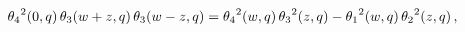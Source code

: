 \[{\mathop{\theta_{4}\/}\nolimits^{2}}\!\left(0,q\right)\mathop{\theta_{3}\/}%
\nolimits\!\left(w+z,q\right)\mathop{\theta_{3}\/}\nolimits\!\left(w-z,q\right%
)={\mathop{\theta_{4}\/}\nolimits^{2}}\!\left(w,q\right){\mathop{\theta_{3}\/}%
\nolimits^{2}}\!\left(z,q\right)-{\mathop{\theta_{1}\/}\nolimits^{2}}\!\left(w%
,q\right){\mathop{\theta_{2}\/}\nolimits^{2}}\!\left(z,q\right),\]